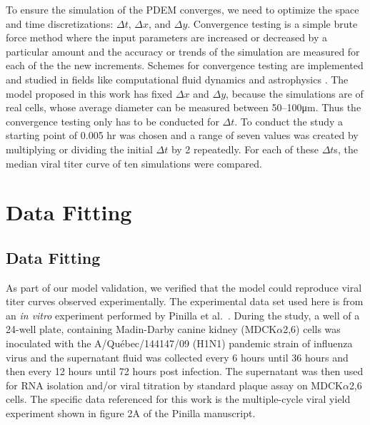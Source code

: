 To ensure the simulation of the PDEM converges, we need to optimize the space and time discretizations: $\Delta t$, $\Delta x$, and $\Delta y$. Convergence testing is a simple brute force method where the input parameters are increased or decreased by a particular amount and the accuracy or trends of the simulation are measured for each of the the new increments. Schemes for convergence testing are implemented and studied in fields like computational fluid dynamics \cite{bermejo16,kim20fluid} and astrophysics \cite{xu21,banei21}. The model proposed in this work has fixed $\Delta x$ and $\Delta y$, because the simulations are of real cells, whose average diameter can be measured between \numrange[range-phrase = --]{50}{100}\si{\micro\meter}. Thus the convergence testing only has to be conducted for $\Delta t$. To conduct the study a starting point of 0.005 hr was chosen and a range of seven values was created by multiplying or dividing the initial $\Delta t$ by 2 repeatedly. For each of these $\Delta t$s, the median viral titer curve of ten simulations were compared.
\section{Data Fitting}
\subsection{Data Fitting} \label{Data_Fitting}

As part of our model validation, we verified that the model could reproduce viral titer curves observed experimentally. The experimental data set used here is from an \emph{in vitro} experiment performed by Pinilla et al.\ \cite{pinilla12}. During the study, a well of a 24-well plate, containing Madin-Darby canine kidney (MDCK$\alpha$2,6) cells was inoculated with the A/Qu\'{e}bec/144147/09 (H1N1) pandemic strain of influenza virus and the supernatant fluid was collected every 6 hours until 36 hours and then every 12 hours until 72 hours post infection. The supernatant was then used for RNA isolation and/or viral titration by standard plaque assay on MDCK$\alpha$2,6 cells. The specific data referenced for this work is the multiple-cycle viral yield experiment shown in figure 2A of the Pinilla manuscript.

